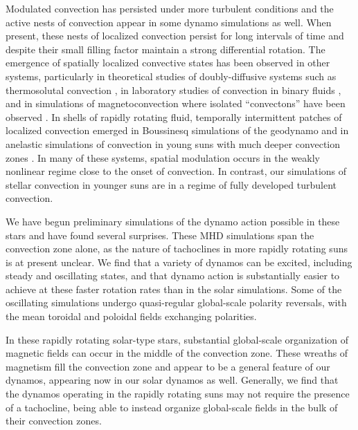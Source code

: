 Modulated convection has persisted under more turbulent conditions and
the active nests of convection appear in some dynamo simulations as well.
When present, these nests of localized convection persist for long intervals of time
and despite their small filling factor maintain a strong differential rotation.
The emergence of spatially localized convective states has been observed in other systems, 
particularly in theoretical studies of doubly-diffusive systems such as thermosolutal convection 
\citep[e.g.,][]{Spina_et_al_1998, Batiste_et_al_2006}, in laboratory studies of convection 
in binary fluids \citep[e.g.,][]{Surko_et_al_1991}, and in simulations of magnetoconvection
where isolated ``convectons'' have been observed \citep{Blanchflower_1999}.  
In shells of rapidly rotating fluid, temporally intermittent patches of localized
convection emerged in Boussinesq simulations of the geodynamo
\citep{Grote&Busse_2000} and in anelastic simulations of convection in
young suns with much deeper convection zones \citep{Ballot_et_al_2006,
Ballot_et_al_2007}.  
In many of these systems, spatial modulation occurs in the weakly nonlinear regime
close to the onset of convection.  In contrast, our simulations
of stellar convection in younger suns are in a regime of fully developed turbulent
convection.

\clearpage
We have begun preliminary simulations of
the dynamo action possible in these stars and have found several
surprises.  These MHD simulations span the
convection zone alone, as the nature of tachoclines in more rapidly
rotating suns is at present unclear.  We find that a variety of
dynamos can be excited, including steady and oscillating states, and
that dynamo action is substantially easier to achieve at these faster
rotation rates than in the solar simulations.  Some of the oscillating
simulations undergo quasi-regular global-scale polarity reversals,
with the mean toroidal and poloidal fields exchanging polarities.  

In these rapidly rotating solar-type stars,
substantial global-scale organization of magnetic
fields can occur in the middle of the convection zone.  These wreaths
of magnetism fill the convection zone and appear to be a general
feature of our dynamos, appearing now in our solar dynamos as well. 
Generally, we find that the dynamos operating in the rapidly rotating
suns may not require the presence of a tachocline, being able to
instead organize global-scale fields in the bulk of their convection zones.




